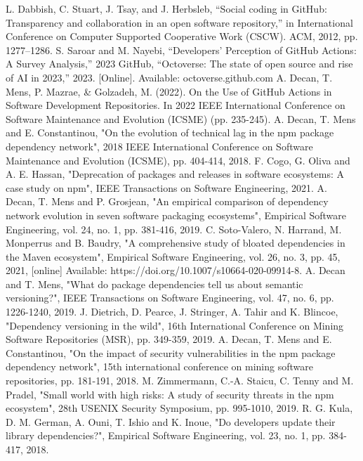 \documentclass[conference]{IEEEtran}
\begin{document}
\begin{thebibliography}{00}
 L. Dabbish, C. Stuart, J. Tsay, and J. Herbsleb, ``Social coding in GitHub: Transparency and collaboration in an open software repository,'' in International Conference on Computer Supported Cooperative Work (CSCW). ACM, 2012, pp. 1277–1286.
 S. Saroar and M. Nayebi, ``Developers' Perception of GitHub Actions: A Survey Analysis,'' 2023
 GitHub, “Octoverse: The state of open source and rise of AI in 2023,” 2023. [Online]. Available: octoverse.github.com
 A. Decan, T. Mens, P. Mazrae, \& Golzadeh, M. (2022). On the Use of GitHub Actions in Software Development Repositories. In 2022 IEEE International Conference on Software Maintenance and Evolution (ICSME) (pp. 235-245).
 A. Decan, T. Mens and E. Constantinou, "On the evolution of technical lag in the npm package dependency network", 2018 IEEE International Conference on Software Maintenance and Evolution (ICSME), pp. 404-414, 2018.
 F. Cogo, G. Oliva and A. E. Hassan, "Deprecation of packages and releases in software ecosystems: A case study on npm", IEEE Transactions on Software Engineering, 2021.
 A. Decan, T. Mens and P. Grosjean, "An empirical comparison of dependency network evolution in seven software packaging ecosystems", Empirical Software Engineering, vol. 24, no. 1, pp. 381-416, 2019.
  C. Soto-Valero, N. Harrand, M. Monperrus and B. Baudry, "A comprehensive study of bloated dependencies in the Maven ecosystem", Empirical Software Engineering, vol. 26, no. 3, pp. 45, 2021, [online] Available: https://doi.org/10.1007/s10664-020-09914-8.
 A. Decan and T. Mens, "What do package dependencies tell us about semantic versioning?", IEEE Transactions on Software Engineering, vol. 47, no. 6, pp. 1226-1240, 2019.
 J. Dietrich, D. Pearce, J. Stringer, A. Tahir and K. Blincoe, "Dependency versioning in the wild", 16th International Conference on Mining Software Repositories (MSR), pp. 349-359, 2019.
A. Decan, T. Mens and E. Constantinou, "On the impact of security vulnerabilities in the npm package dependency network", 15th international conference on mining software repositories, pp. 181-191, 2018.
 M. Zimmermann, C.-A. Staicu, C. Tenny and M. Pradel, "Small world with high risks: A study of security threats in the npm ecosystem", 28th USENIX Security Symposium, pp. 995-1010, 2019.
 R. G. Kula, D. M. German, A. Ouni, T. Ishio and K. Inoue, "Do developers update their library dependencies?", Empirical Software Engineering, vol. 23, no. 1, pp. 384-417, 2018.

\end{thebibliography}
\end{document}
